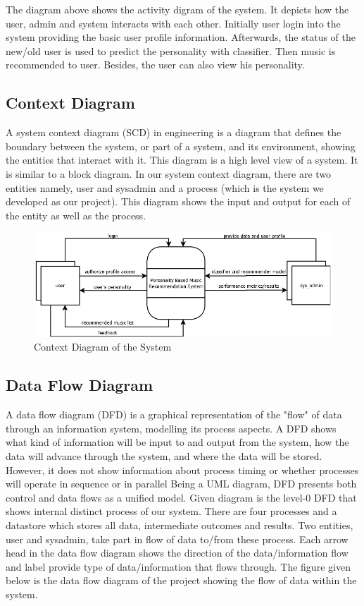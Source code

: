 The diagram above shows the activity digram of the system. It depicts how the user, admin and system interacts with each other. Initially user login into the system providing the basic user profile information. Afterwards, the status of the new/old user is used to predict the personality with classifier. Then music is recommended to user. Besides, the user can also view his personality.

\newpage
\subsection{Context Diagram}

A system context diagram (SCD) in engineering is a diagram that defines the boundary between the system, or part of a system, and its environment, showing the entities that interact with it. This diagram is a high level view of a system. It is similar to a block diagram. In our system context diagram, there are two entities namely, user and sysadmin and a process (which is the system we developed as our project). This diagram shows the input and output for each of the entity as well as the process.
\begin{figure}[!ht]

\centering
\includegraphics[width = 16 cm]{fig/new/dfd0.png}
\caption{Context Diagram of the System}
\label{fig:dfd0}
\end{figure}
\newpage
\subsection{Data Flow Diagram}
A data flow diagram (DFD) is a graphical representation of the "flow" of data through an information system, modelling its process aspects. A DFD shows what kind of information will be input to and output from the system, how the data will advance through the system, and where the data will be stored. However, it does not show information about process timing or whether processes will operate in sequence or in parallel Being a UML diagram, DFD presents both control and data flows as a unified model. Given diagram is the level-0 DFD that shows internal distinct process of our system. There are four processes and a datastore which stores all data, intermediate outcomes and results. Two entities, user and sysadmin, take part in flow of data to/from these process. Each arrow head in the data flow diagram shows the direction of the data/information flow and label provide type of data/information that flows through.
The figure given below is the data flow diagram of the project showing the flow of data within the system.


